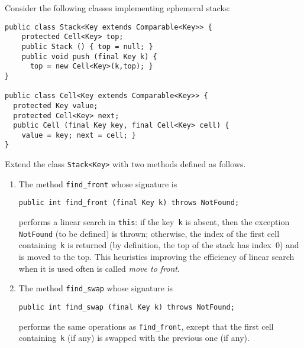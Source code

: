 \documentclass[11pt,a4paper]{article}
\author{Christian Rinderknecht}
\date{24 October 2013}
\begin{document}
\maketitle

\noindent Consider the following classes implementing ephemeral
stacks:
\begin{verbatim}
public class Stack<Key extends Comparable<Key>> {
    protected Cell<Key> top;
    public Stack () { top = null; }
    public void push (final Key k) {
      top = new Cell<Key>(k,top); }
}

public class Cell<Key extends Comparable<Key>> {
  protected Key value;
  protected Cell<Key> next;
  public Cell (final Key key, final Cell<Key> cell) {
    value = key; next = cell; }
}
\end{verbatim}
Extend the class \texttt{Stack<Key>} with two methods defined as follows.
\begin{enumerate}

  \item The method \texttt{find\_front} whose signature is
\begin{verbatim}
public int find_front (final Key k) throws NotFound;
\end{verbatim}
    performs a linear search in \texttt{this}: if the key~\texttt{k}
    is absent, then the exception \texttt{NotFound} (to be defined) is
    thrown; otherwise, the index of the first cell
    containing~\texttt{k} is returned (by definition, the top of the
    stack has index~\(0\)) and is moved to the top. This heuristics
    improving the efficiency of linear search when it is used often is
    called \emph{move to front}.

  \item The method \texttt{find\_swap} whose signature is
\begin{verbatim}
public int find_swap (final Key k) throws NotFound;
\end{verbatim}
    performs the same operations as \texttt{find\_front}, except that
    the first cell containing~\texttt{k} (if any) is swapped with the
    previous one (if any).
\end{enumerate}

\newpage
\end{document}
